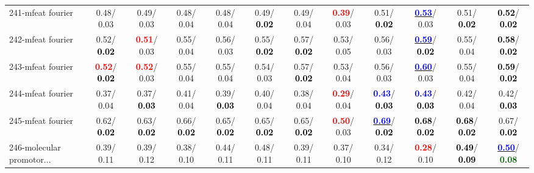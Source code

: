 \begin{table}[h]
\begin{center}
{\begin{tabular}{lc|c|c|c|c|c|c|c|c|c|c}
241-mfeat fourier &   0.48/  0.03 &   0.49/  0.03 &   0.48/  0.04 &   0.48/  0.04 &   0.49/\textcolor{black}{\textbf{  0.02}} &   0.49/  0.04 & \textcolor{red}{\textbf{  0.39}}/  0.03 &   0.51/\textcolor{black}{\textbf{  0.02}} & \underline{\textcolor{blue}{\textbf{  0.53}}}/  0.03 &   0.51/\textcolor{black}{\textbf{  0.02}} & \textcolor{black}{\textbf{  0.52}}/\textcolor{black}{\textbf{  0.02}} \\
242-mfeat fourier &   0.52/\textcolor{black}{\textbf{  0.02}} & \textcolor{red}{\textbf{  0.51}}/  0.03 &   0.55/  0.04 &   0.56/  0.03 &   0.55/\textcolor{black}{\textbf{  0.02}} &   0.57/\textcolor{black}{\textbf{  0.02}} &   0.53/  0.05 &   0.56/  0.03 & \underline{\textcolor{blue}{\textbf{  0.59}}}/\textcolor{black}{\textbf{  0.02}} &   0.55/  0.04 & \textcolor{black}{\textbf{  0.58}}/\textcolor{black}{\textbf{  0.02}} \\
243-mfeat fourier & \textcolor{red}{\textbf{  0.52}}/\textcolor{black}{\textbf{  0.02}} & \textcolor{red}{\textbf{  0.52}}/  0.03 &   0.55/  0.04 &   0.55/  0.04 &   0.54/  0.03 &   0.57/\textcolor{black}{\textbf{  0.02}} &   0.53/  0.04 &   0.56/  0.03 & \underline{\textcolor{blue}{\textbf{  0.60}}}/  0.03 &   0.55/  0.04 & \textcolor{black}{\textbf{  0.59}}/\textcolor{black}{\textbf{  0.02}} \\
244-mfeat fourier &   0.37/  0.04 &   0.37/\textcolor{black}{\textbf{  0.03}} &   0.41/  0.04 &   0.39/\textcolor{black}{\textbf{  0.03}} &   0.40/  0.04 &   0.38/  0.04 & \textcolor{red}{\textbf{  0.29}}/  0.04 & \textcolor{blue}{\textbf{  0.43}}/\textcolor{black}{\textbf{  0.03}} & \textcolor{blue}{\textbf{  0.43}}/\textcolor{black}{\textbf{  0.03}} &   0.42/  0.04 &   0.42/\textcolor{black}{\textbf{  0.03}} \\
245-mfeat fourier &   0.62/\textcolor{black}{\textbf{  0.02}} &   0.63/\textcolor{black}{\textbf{  0.02}} &   0.66/\textcolor{black}{\textbf{  0.02}} &   0.65/\textcolor{black}{\textbf{  0.02}} &   0.65/\textcolor{black}{\textbf{  0.02}} &   0.65/\textcolor{black}{\textbf{  0.02}} & \textcolor{red}{\textbf{  0.50}}/  0.03 & \underline{\textcolor{blue}{\textbf{  0.69}}}/\textcolor{black}{\textbf{  0.02}} & \textcolor{black}{\textbf{  0.68}}/\textcolor{black}{\textbf{  0.02}} & \textcolor{black}{\textbf{  0.68}}/\textcolor{black}{\textbf{  0.02}} &   0.67/\textcolor{black}{\textbf{  0.02}} \\ \hline
246-molecular promotor... &   0.39/  0.11 &   0.39/  0.12 &   0.38/  0.10 &   0.44/  0.11 &   0.48/  0.11 &   0.39/  0.11 &   0.37/  0.10 &   0.34/  0.12 & \textcolor{red}{\textbf{  0.28}}/  0.10 & \textcolor{black}{\textbf{  0.49}}/\textcolor{black}{\textbf{  0.09}} & \underline{\textcolor{blue}{\textbf{  0.50}}}/\textcolor{darkgreen}{\textbf{  0.08}} \\

\end{tabular}}
\end{center}
\end{table}
